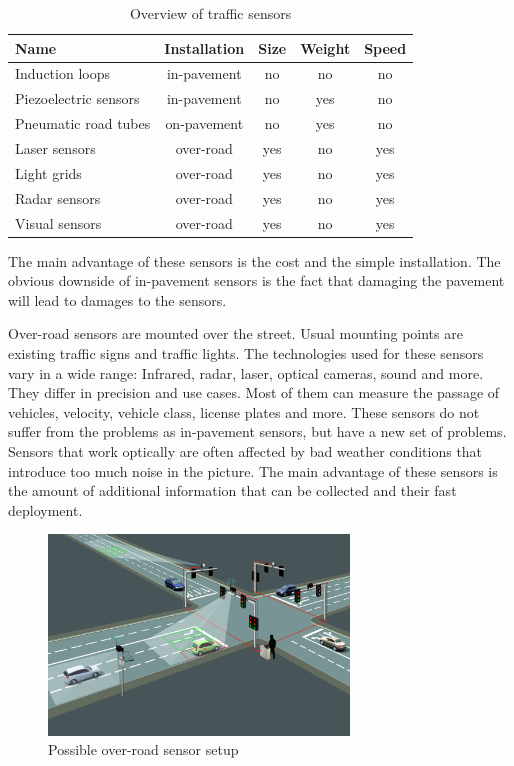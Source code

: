 \begin{table}[hb!]
	\centering
	\begin{tabular}{l|c|c|c|c}
		Name & Installation & Size & Weight & Speed \\
		\hline\hline
		Induction loops & in-pavement & no & no & no \\
		Piezoelectric sensors & in-pavement & no & yes & no \\
		Pneumatic road tubes & on-pavement & no & yes & no \\
		Laser sensors & over-road & yes & no & yes \\
		Light grids & over-road & yes & no & yes \\
		Radar sensors & over-road & yes & no & yes \\
		Visual sensors & over-road & yes & no & yes \\
	\end{tabular}
	\caption{Overview of traffic sensors}
	\label{sensor_overview}
\end{table}

The main advantage of these sensors is the cost and the simple installation. The obvious downside of in-pavement sensors is the fact that damaging the pavement will lead to damages to the sensors.

Over-road sensors are mounted over the street. Usual mounting points are existing traffic signs and traffic lights. The technologies used for these sensors vary in a wide range: Infrared, radar, laser, optical cameras, sound and more. They differ in precision and use cases. Most of them can measure the passage of vehicles, velocity, vehicle class, license plates and more. These sensors do not suffer from the problems as in-pavement sensors, but have a new set of problems. Sensors that work optically are often affected by bad weather conditions that introduce too much noise in the picture. The main advantage of these sensors is the amount of additional information that can be collected and their fast deployment. \cite{tdh}

\begin{figure}[ht]
	\centering
	\includegraphics[width=8cm]{figures/overroad-sensor}
	\caption[Possible over-road sensor setup]{Possible over-road sensor setup\protect\footnotemark}
	\label{overroad-sensor}
\end{figure}

